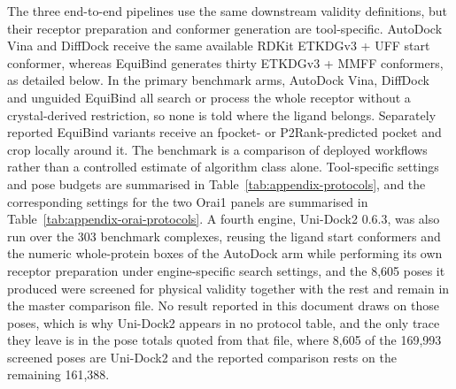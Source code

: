 The three end-to-end pipelines use the same downstream validity definitions, but their receptor preparation and conformer generation are tool-specific. AutoDock Vina and DiffDock receive the same available RDKit \cite{ref086} ETKDGv3 + UFF start conformer, whereas EquiBind generates thirty ETKDGv3 + MMFF conformers, as detailed below. In the primary benchmark arms, AutoDock Vina, DiffDock and unguided EquiBind all search or process the whole receptor without a crystal-derived restriction, so none is told where the ligand belongs. Separately reported EquiBind variants receive an fpocket- or P2Rank-predicted pocket and crop locally around it. The benchmark is a comparison of deployed workflows rather than a controlled estimate of algorithm class alone. Tool-specific settings and pose budgets are summarised in Table~\ref{tab:appendix-protocols}, and the corresponding settings for the two Orai1 panels are summarised in Table~\ref{tab:appendix-orai-protocols}. A fourth engine, Uni-Dock2 0.6.3, was also run over the 303 benchmark complexes, reusing the ligand start conformers and the numeric whole-protein boxes of the AutoDock arm while performing its own receptor preparation under engine-specific search settings, and the 8,605 poses it produced were screened for physical validity together with the rest and remain in the master comparison file. No result reported in this document draws on those poses, which is why Uni-Dock2 appears in no protocol table, and the only trace they leave is in the pose totals quoted from that file, where 8,605 of the 169,993 screened poses are Uni-Dock2 and the reported comparison rests on the remaining 161,388.


